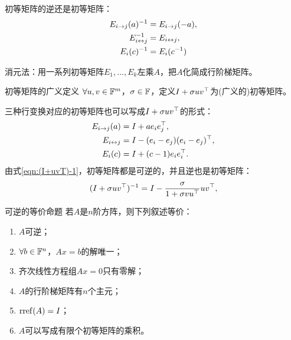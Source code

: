\begin{corollary}
	初等矩阵的逆还是初等矩阵：
	\begin{subequations}
		\begin{align}
			E_{i\to j}(a)^{-1}&=E_{i\to j}(-a),\\
			E_{i\leftrightarrow j}^{-1}&=E_{i\leftrightarrow j},\\
			E_i(c)^{-1}&=E_i(c^{-1})
		\end{align}
	\end{subequations}
\end{corollary}

\begin{remark}
	消元法：用一系列初等矩阵$E_1,\ldots,E_k$左乘$A$，把$A$化简成行阶梯矩阵。
\end{remark}

\begin{definition}
	{初等矩阵的广义定义}{}
	$\forall u,v\in\mathbb F^m$，$\sigma\in\mathbb F$，定义$I+\sigma uv^\top$为(广义的)初等矩阵。
\end{definition}
\begin{remark}
	三种行变换对应的初等矩阵也可以写成$I+\sigma uv^\top$的形式：
	\begin{subequations}
		\begin{align}
			E_{i\to j}(a)&=I+ae_ie_j^\top,\\
			E_{i\leftrightarrow j}&=I-(e_i-e_j)(e_i-e_j)^\top,\\
			E_i(c)&=I+(c-1)e_ie_i^\top.
		\end{align}
	\end{subequations}
	由式\eqref{eqn:(I+uvT)-1}，初等矩阵都是可逆的，并且逆也是初等矩阵：
	\begin{equation}
		(I+\sigma uv^\top)^{-1}=I-\frac{\sigma}{1+\sigma vu^\top}uv^\top,
	\end{equation}
\end{remark}

\begin{theorem}
	{可逆的等价命题}{}
	若$A$是$n$阶方阵，则下列叙述等价：
	\begin{enumerate}
		\item $A$可逆；
		\item $\forall b\in\mathbb F^n$，$Ax=b$的解唯一；
		\item 齐次线性方程组$Ax=0$只有零解；
		\item $A$的行阶梯矩阵有$n$个主元；
		\item $\operatorname{rref}(A)=I$；
		\item $A$可以写成有限个初等矩阵的乘积。
	\end{enumerate}
\end{theorem}

